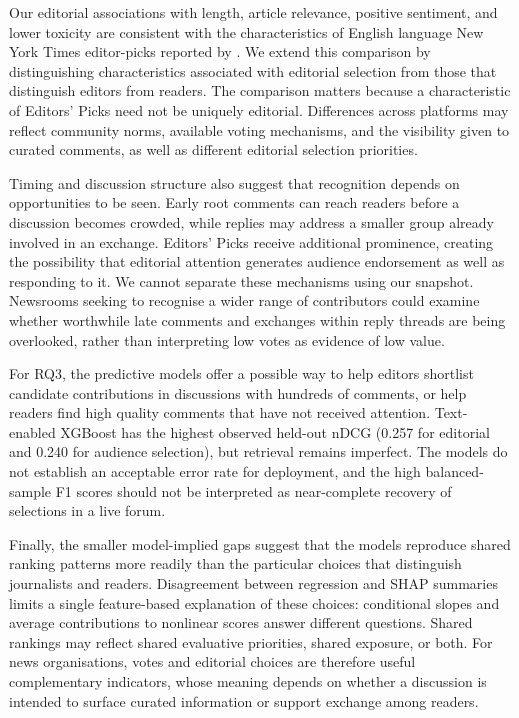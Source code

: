 Our editorial associations with length, article relevance, positive sentiment, and lower toxicity are consistent with the characteristics of English language New York Times editor-picks reported by \citet{He2024}. We extend this comparison by distinguishing characteristics associated with editorial selection from those that distinguish editors from readers. The comparison matters because a characteristic of Editors' Picks need not be uniquely editorial. Differences across platforms may reflect community norms, available voting mechanisms, and the visibility given to curated comments, as well as different editorial selection priorities.

Timing and discussion structure also suggest that recognition depends on opportunities to be seen. Early root comments can reach readers before a discussion becomes crowded, while replies may address a smaller group already involved in an exchange. Editors' Picks receive additional prominence, creating the possibility that editorial attention generates audience endorsement as well as responding to it. We cannot separate these mechanisms using our snapshot. Newsrooms seeking to recognise a wider range of contributors could examine whether worthwhile late comments and exchanges within reply threads are being overlooked, rather than interpreting low votes as evidence of low value.

For RQ3, the predictive models offer a possible way to help editors shortlist candidate contributions in discussions with hundreds of comments, or help readers find high quality comments that have not received attention. Text-enabled XGBoost has the highest observed held-out nDCG (0.257 for editorial and 0.240 for audience selection), but retrieval remains imperfect. The models do not establish an acceptable error rate for deployment, and the high balanced-sample F1 scores should not be interpreted as near-complete recovery of selections in a live forum.

Finally, the smaller model-implied gaps suggest that the models reproduce shared ranking patterns more readily than the particular choices that distinguish journalists and readers. Disagreement between regression and SHAP summaries limits a single feature-based explanation of these choices: conditional slopes and average contributions to nonlinear scores answer different questions. Shared rankings may reflect shared evaluative priorities, shared exposure, or both. For news organisations, votes and editorial choices are therefore useful complementary indicators, whose meaning depends on whether a discussion is intended to surface curated information or support exchange among readers.

